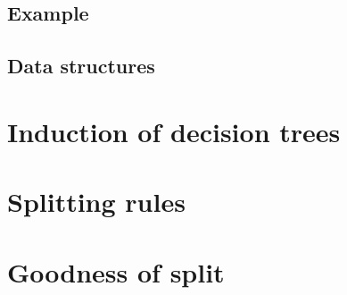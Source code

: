 \subsection{Example}


\subsection{Data structures}




\section{Induction of decision trees}
\label{sec:3:induction}


\section{Splitting rules}
\label{sec:3:splitting-rules}


\section{Goodness of split}
\label{sec:3:criteria}


